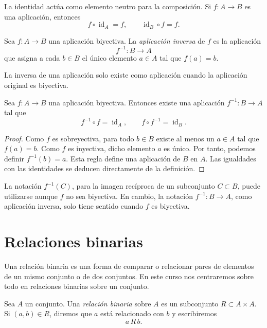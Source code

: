 La identidad actúa como elemento neutro para la composición. Si \(f:A\to B\) es una aplicación, entonces
\[
f\circ \operatorname{id}_A=f,
\qquad
\operatorname{id}_B\circ f=f.
\]

\begin{definicion}
Sea \(f:A\to B\) una aplicación biyectiva. La \emph{aplicación inversa} de \(f\) es la aplicación
\[
f^{-1}:B\to A
\]
que asigna a cada \(b\in B\) el único elemento \(a\in A\) tal que \(f(a)=b\).
\end{definicion}

La inversa de una aplicación solo existe como aplicación cuando la aplicación original es biyectiva.

\begin{proposicion}
Sea \(f:A\to B\) una aplicación biyectiva. Entonces existe una aplicación \(f^{-1}:B\to A\) tal que
\[
f^{-1}\circ f=\operatorname{id}_A,
\qquad
f\circ f^{-1}=\operatorname{id}_B.
\]
\end{proposicion}

\begin{proof}
Como \(f\) es sobreyectiva, para todo \(b\in B\) existe al menos un \(a\in A\) tal que \(f(a)=b\). Como \(f\) es inyectiva, dicho elemento \(a\) es único. Por tanto, podemos definir \(f^{-1}(b)=a\). Esta regla define una aplicación de \(B\) en \(A\). Las igualdades con las identidades se deducen directamente de la definición.
\end{proof}

\begin{advertencia}
La notación \(f^{-1}(C)\), para la imagen recíproca de un subconjunto \(C\subset B\), puede utilizarse aunque \(f\) no sea biyectiva. En cambio, la notación \(f^{-1}:B\to A\), como aplicación inversa, solo tiene sentido cuando \(f\) es biyectiva.
\end{advertencia}

\section{Relaciones binarias}

Una relación binaria es una forma de comparar o relacionar pares de elementos de un mismo conjunto o de dos conjuntos. En este curso nos centraremos sobre todo en relaciones binarias sobre un conjunto.

\begin{definicion}
Sea \(A\) un conjunto. Una \emph{relación binaria} sobre \(A\) es un subconjunto \(R\subset A\times A\).
Si \((a,b)\in R\), diremos que \(a\) está relacionado con \(b\) y escribiremos
\[
a\,R\,b.
\]
\end{definicion}

